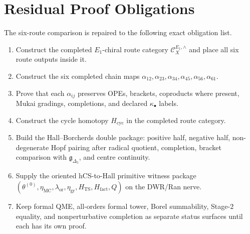 \documentclass[11pt]{amsart}
\theoremstyle{plain}
\theoremstyle{definition}
\theoremstyle{remark}
\providecommand{\Eone}{E_1}
\providecommand{\Gdelta}{\mathfrak g_{\Delta_{5}}}
\begin{document}
\section{Residual Proof Obligations}
\label{sec:residual-obligations}

The six-route comparison is repaired to the following exact obligation
list.
\begin{enumerate}[label=\textbf{O\arabic*.},leftmargin=2.5em]
\item Construct the completed $\Eone$-chiral route category
$\mathcal C_X^{E_1,\wedge}$ and place all six route outputs inside it.
\item Construct the six completed chain maps
$\alpha_{12},\alpha_{23},\alpha_{34},\alpha_{45},\alpha_{56},\alpha_{61}$.
\item Prove that each $\alpha_{ij}$ preserves OPEs, brackets,
coproducts where present, Mukai gradings, completions, and declared
$\kappa_\bullet$ labels.
\item Construct the cycle homotopy $H_{\mathrm{cyc}}$ in the completed
route category.
\item Build the Hall--Borcherds double package:
positive half, negative half, non-degenerate Hopf pairing after radical
quotient, completion, bracket comparison with $\Gdelta$, and centre
continuity.
\item Supply the oriented hCS-to-Hall primitive witness package
$(\theta^{(0)},\eta_{\mathrm{MC}},\lambda_{\mathrm{or}},
\eta_{\mathrm{gr}},H_{\mathrm{TS}},H_{\mathrm{fact}},Q)$ on the DWR/Ran
nerve.
\item Keep formal QME, all-orders formal tower, Borel summability,
Stage-$2$ equality, and nonperturbative completion as separate status
surfaces until each has its own proof.
\end{enumerate}
\end{document}
